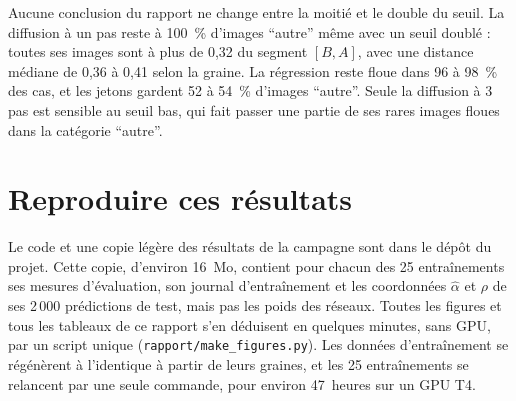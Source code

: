 \documentclass[a4paper, 11pt]{article}
\newcommand{\ahat}{\hat\alpha}
\begin{document}
Aucune conclusion du rapport ne change entre la moitié et le double du seuil. La diffusion à un pas reste à 100~\% d'images
\enquote{autre} même avec un seuil doublé : toutes ses images sont à plus de 0,32 du segment $[B, A]$, avec une distance médiane de 0,36 à 0,41 selon la graine. La
régression reste floue dans 96 à 98~\% des cas, et les jetons gardent 52 à 54~\% d'images \enquote{autre}. Seule la diffusion à
3 pas est sensible au seuil bas, qui fait passer une partie de ses rares images floues dans la catégorie \enquote{autre}.

\section{Reproduire ces résultats}\label{app:reproduire}

Le code et une copie légère des résultats de la campagne sont dans le dépôt du projet. Cette copie, d'environ 16~Mo, contient pour chacun des 25 entraînements ses mesures d'évaluation, son journal d'entraînement et les coordonnées $\ahat$ et $\rho$ de ses 2\,000 prédictions de test, mais pas les poids des réseaux. Toutes les figures et tous les tableaux de ce rapport s'en déduisent en quelques minutes, sans GPU, par un script unique (\texttt{rapport/make\_figures.py}). Les données d'entraînement se régénèrent à l'identique à partir de leurs graines, et les 25 entraînements se relancent par une seule commande, pour environ 47~heures sur un GPU T4.
\end{document}
